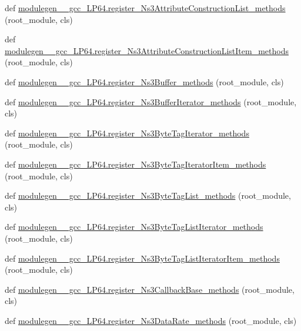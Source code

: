 \begin{DoxyCompactItemize}
\item 
def \hyperlink{namespacemodulegen____gcc__LP64_a4dea76fc9218ba239313d01e5ac1d4cd}{modulegen\+\_\+\+\_\+gcc\+\_\+\+L\+P64.\+register\+\_\+\+Ns3\+Attribute\+Construction\+List\+\_\+methods} (root\+\_\+module, cls)
\item 
def \hyperlink{namespacemodulegen____gcc__LP64_a897162c4bcad09fae06079f3c1b24777}{modulegen\+\_\+\+\_\+gcc\+\_\+\+L\+P64.\+register\+\_\+\+Ns3\+Attribute\+Construction\+List\+Item\+\_\+methods} (root\+\_\+module, cls)
\item 
def \hyperlink{namespacemodulegen____gcc__LP64_ad545f8eb2320e09bf6e5be02690b4eaa}{modulegen\+\_\+\+\_\+gcc\+\_\+\+L\+P64.\+register\+\_\+\+Ns3\+Buffer\+\_\+methods} (root\+\_\+module, cls)
\item 
def \hyperlink{namespacemodulegen____gcc__LP64_a219f36a56f22b6e50de65d276cdf742d}{modulegen\+\_\+\+\_\+gcc\+\_\+\+L\+P64.\+register\+\_\+\+Ns3\+Buffer\+Iterator\+\_\+methods} (root\+\_\+module, cls)
\item 
def \hyperlink{namespacemodulegen____gcc__LP64_ae692c5fa47566ed6b225ae5a5ca35235}{modulegen\+\_\+\+\_\+gcc\+\_\+\+L\+P64.\+register\+\_\+\+Ns3\+Byte\+Tag\+Iterator\+\_\+methods} (root\+\_\+module, cls)
\item 
def \hyperlink{namespacemodulegen____gcc__LP64_ade2c2970e32bf8b776b3624afcc4082d}{modulegen\+\_\+\+\_\+gcc\+\_\+\+L\+P64.\+register\+\_\+\+Ns3\+Byte\+Tag\+Iterator\+Item\+\_\+methods} (root\+\_\+module, cls)
\item 
def \hyperlink{namespacemodulegen____gcc__LP64_ad929f8749eef52cadc734fee358cacd9}{modulegen\+\_\+\+\_\+gcc\+\_\+\+L\+P64.\+register\+\_\+\+Ns3\+Byte\+Tag\+List\+\_\+methods} (root\+\_\+module, cls)
\item 
def \hyperlink{namespacemodulegen____gcc__LP64_aa7b7804ddcf3a3b4d83820f193414ea4}{modulegen\+\_\+\+\_\+gcc\+\_\+\+L\+P64.\+register\+\_\+\+Ns3\+Byte\+Tag\+List\+Iterator\+\_\+methods} (root\+\_\+module, cls)
\item 
def \hyperlink{namespacemodulegen____gcc__LP64_a262c89a667105a6a7bc764058f464ab3}{modulegen\+\_\+\+\_\+gcc\+\_\+\+L\+P64.\+register\+\_\+\+Ns3\+Byte\+Tag\+List\+Iterator\+Item\+\_\+methods} (root\+\_\+module, cls)
\item 
def \hyperlink{namespacemodulegen____gcc__LP64_a911c07db6d52106940012fbb077a0853}{modulegen\+\_\+\+\_\+gcc\+\_\+\+L\+P64.\+register\+\_\+\+Ns3\+Callback\+Base\+\_\+methods} (root\+\_\+module, cls)
\item 
def \hyperlink{namespacemodulegen____gcc__LP64_acee8aed9090be58f00e76c4c73ae1396}{modulegen\+\_\+\+\_\+gcc\+\_\+\+L\+P64.\+register\+\_\+\+Ns3\+Data\+Rate\+\_\+methods} (root\+\_\+module, cls)

\end{DoxyCompactItemize}
